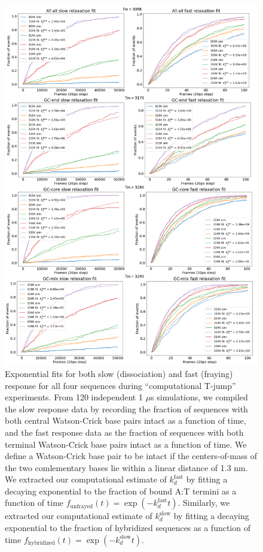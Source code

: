 \documentclass[journal=jpcbfk,manuscript=article]{achemso}
\begin{document}
\begin{figure}[ht!]
	\centering
    \includegraphics[width=.70\textwidth]{FigS4.pdf}
    \caption{Exponential fits for both slow (dissociation) and fast (fraying) response for all four sequences during ``computational T-jump'' experiments. From 120 independent 1 $\mu$s simulations, we compiled the slow response data by recording the fraction of sequences with both central Watson-Crick base pairs intact as a function of time, and the fast response data as the fraction of sequences with both terminal Watson-Crick base pairs intact as a function of time. We define a Watson-Crick base pair to be intact if the centers-of-mass of the two comlementary bases lie within a linear distance of 1.3 nm. We extracted our computational estimate of $k_d^\mathrm{fast}$ by fitting a decaying exponential to the fraction of bound A:T termini as a function of time $f_\mathrm{unfrayed}(t) = \exp(-k_d^\mathrm{fast}t)$. Similarly, we extracted our computational estimate of $k_d^\mathrm{slow}$ by fitting a decaying exponential to the fraction of hybridized sequences as a function of time $f_\mathrm{hybridized}(t) = \exp(-k_d^\mathrm{slow}t)$.}
    \label{fig:SIFig4}
\end{figure}

\clearpage
\newpage
\end{document}
